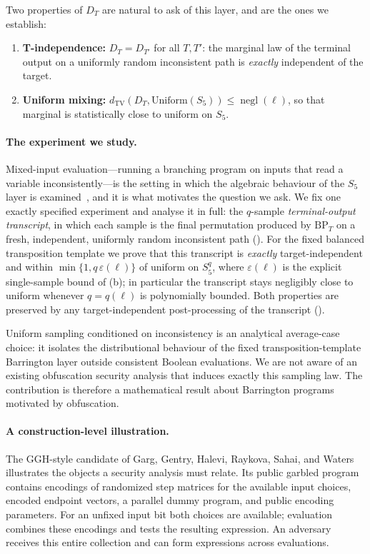 \documentclass[version=final]{iacrcc}
\DeclareMathOperator{\negl}{negl}
\newcommand{\dtv}{d_{\mathrm{TV}}}
\newcommand{\BP}{\mathrm{BP}}
\begin{document}
Two properties of $D_T$ are natural to ask of this layer, and are the ones we
establish:

\begin{enumerate}[label=(\roman*)]
\item \textbf{T-independence:} $D_T = D_{T'}$ for all $T, T'$: the marginal law
  of the terminal output on a uniformly random inconsistent path is
  \emph{exactly} independent of the target.
\item \textbf{Uniform mixing:} $\dtv(D_T, \mathrm{Uniform}(S_5)) \leq \negl(\ell)$,
  so that marginal is statistically close to uniform on $S_5$.
\end{enumerate}

\paragraph{The experiment we study.}
Mixed-input evaluation---running a branching program on inputs that read a
variable inconsistently---is the setting in which the algebraic behaviour of the
$S_5$ layer is examined~\cite{CVW18}, and it is what motivates the question we
ask. We fix one exactly specified experiment and analyse it in full: the
$q$-sample \emph{terminal-output transcript}, in which each sample is the final
permutation produced by $\BP_T$ on a fresh, independent, uniformly random
inconsistent path (). For the fixed balanced transposition
template we prove that this transcript is \emph{exactly} target-independent and
within $\min\{1, q\,\varepsilon(\ell)\}$ of uniform on $S_5^q$, where
$\varepsilon(\ell)$ is the explicit single-sample bound of (b);
in particular the transcript stays negligibly close to uniform whenever
$q = q(\ell)$ is polynomially bounded. Both properties are preserved by any
target-independent post-processing of the transcript ().

Uniform sampling conditioned on inconsistency is an analytical average-case
choice: it isolates the distributional behaviour of the fixed
transposition-template Barrington layer outside consistent Boolean evaluations.
We are not aware of an existing obfuscation security analysis that induces
exactly this sampling law. The contribution is therefore a mathematical result
about Barrington programs motivated by obfuscation.

\paragraph{A construction-level illustration.}
The GGH-style candidate of Garg, Gentry, Halevi, Raykova, Sahai, and
Waters~\cite[full version, Sections~4.1--4.2]{GGH+13}
illustrates the objects a security analysis must relate. Its public garbled
program contains encodings of randomized step matrices for the available input
choices, encoded endpoint vectors, a parallel dummy program, and public encoding
parameters. For an unfixed input bit both choices are available; evaluation
combines these encodings and tests the resulting expression. An adversary
receives this entire collection and can form expressions across evaluations.
\end{document}
